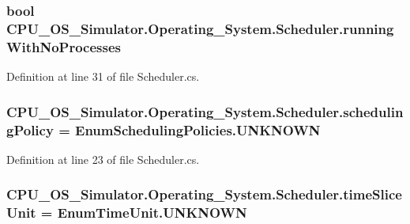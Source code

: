 \subsubsection[{running\+With\+No\+Processes}]{\setlength{\rightskip}{0pt plus 5cm}bool C\+P\+U\+\_\+\+O\+S\+\_\+\+Simulator.\+Operating\+\_\+\+System.\+Scheduler.\+running\+With\+No\+Processes\hspace{0.3cm}{\ttfamily [private]}}\label{class_c_p_u___o_s___simulator_1_1_operating___system_1_1_scheduler_af3276e8686d9efa7f8da6e48257922e3}


Definition at line 31 of file Scheduler.\+cs.

\hypertarget{class_c_p_u___o_s___simulator_1_1_operating___system_1_1_scheduler_a5a0194d8bb0127f6a8c010241d9ccb42}{}
\subsubsection[{scheduling\+Policy}]{ C\+P\+U\+\_\+\+O\+S\+\_\+\+Simulator.\+Operating\+\_\+\+System.\+Scheduler.\+scheduling\+Policy = {\bf Enum\+Scheduling\+Policies.\+U\+N\+K\+N\+O\+W\+N}\hspace{0.3cm}{\ttfamily [private]}}\label{class_c_p_u___o_s___simulator_1_1_operating___system_1_1_scheduler_a5a0194d8bb0127f6a8c010241d9ccb42}


Definition at line 23 of file Scheduler.\+cs.

\hypertarget{class_c_p_u___o_s___simulator_1_1_operating___system_1_1_scheduler_a0622698ea0dc65d42250dae5787846fd}{}
\subsubsection[{time\+Slice\+Unit}]{ C\+P\+U\+\_\+\+O\+S\+\_\+\+Simulator.\+Operating\+\_\+\+System.\+Scheduler.\+time\+Slice\+Unit = {\bf Enum\+Time\+Unit.\+U\+N\+K\+N\+O\+W\+N}\hspace{0.3cm}{\ttfamily [private]}}\label{class_c_p_u___o_s___simulator_1_1_operating___system_1_1_scheduler_a0622698ea0dc65d42250dae5787846fd}


